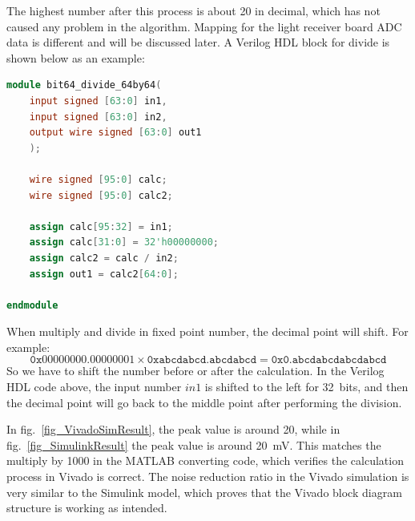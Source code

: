The highest number after this process is about 20 in decimal, which has not caused any problem in the algorithm.  Mapping for the light receiver board ADC data is different and will be discussed later.  A Verilog HDL block for divide is shown below as an example:

\begin{lstlisting}[language=verilog]
module bit64_divide_64by64(
    input signed [63:0] in1,
    input signed [63:0] in2,
    output wire signed [63:0] out1
    );
    
    wire signed [95:0] calc;
    wire signed [95:0] calc2;
    
    assign calc[95:32] = in1;
    assign calc[31:0] = 32'h00000000;
    assign calc2 = calc / in2;
    assign out1 = calc2[64:0];
    
endmodule
\end{lstlisting}

When multiply and divide in fixed point number, the decimal point will shift.  For example:
$$\mathtt{0x00000000.00000001}\times\mathtt{0xabcdabcd.abcdabcd}=\mathtt{0x0.abcdabcdabcdabcd}$$
So we have to shift the number before or after the calculation.  In the Verilog HDL code above, the input number $in1$ is shifted to the left for \qty{32}{bits}, and then the decimal point will go back to the middle point after performing the division.

In fig.~\ref{fig_VivadoSimResult}, the peak value is around 20, while in fig.~\ref{fig_SimulinkResult} the peak value is around \qty{20}{mV}.  This matches the multiply by 1000 in the MATLAB converting code, which verifies the calculation process in Vivado is correct.  The noise reduction ratio in the Vivado simulation is very similar to the Simulink model, which proves that the Vivado block diagram structure is working as intended.

